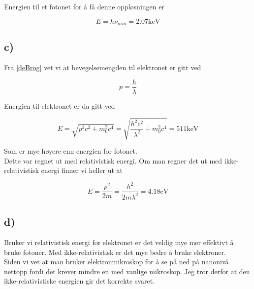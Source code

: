 \documentclass[a4paper,norsk, 10pt]{article}
\begin{document}
Energien til et fotonet for å få denne oppløsningen er

$$
E = h\nu_{min} = 2.07 \mathrm{keV}
$$

\subsection*{c)}

Fra \ref{deBrog} vet vi at bevegelsemengden til elektronet er gitt ved

$$
p = \frac{h}{\lambda}
$$

Energien til elektronet er da gitt ved

$$
E = \sqrt{p^2c^2 + m_0^2c^4} = \sqrt{\frac{h^2c^2}{\lambda^2} + m_0^2c^4} = 511\mathrm{keV}
$$


Som er mye høyere enn energien for fotonet.\\

Dette var regnet ut med relativistisk energi. Om man regner det ut med ikke-relativistisk energi finner vi heller ut at

$$
E = \frac{p^2}{2m} = \frac{h^2}{2m\lambda^2} = 4.18 \mathrm{eV}
$$

\subsection*{d)}
Bruker vi relativistisk energi for elektronet er det veldig mye mer effektivt å bruke fotoner. Med ikke-relativistisk er det mye bedre å bruke elektroner.\\

Siden vi vet at man bruker elektronmikroskop for å se på ned på nanonivå nettopp fordi det krever mindre en med vanlige mikroskop. Jeg tror derfor at den ikke-relativistiske energien gir det korrekte svaret.
\end{document}

